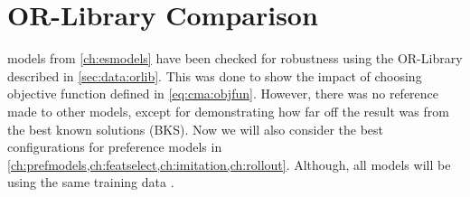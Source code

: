 

\chapter{OR-Library Comparison}\label{ch:orlibrobust} 

 models from 
\cref{ch:esmodels} have been checked for robustness using the OR-Library 
described in \cref{sec:data:orlib}. This was done to show the 
impact of choosing objective function defined in \cref{eq:cma:objfun}. 
However, there was no reference made to other models, except for demonstrating 
how far off the result was from the best known solutions (BKS).
Now we will also consider the best configurations for preference models in 
\cref{ch:prefmodels,ch:featselect,ch:imitation,ch:rollout}.
Although, all models will be using the same training data .

